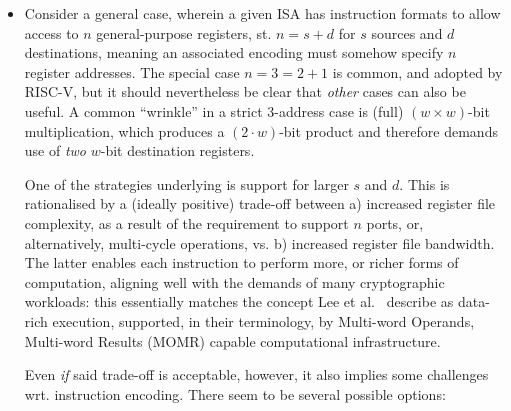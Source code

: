 \begin{itemize}
\item Consider a general case, wherein a given ISA has instruction formats
      to allow access to $n$ general-purpose registers, st. 
      $
      n = s + d
      $ 
      for $s$ sources and $d$ destinations, meaning an associated encoding 
      must somehow specify $n$ register addresses.  The special case
      $
      n = 3 = 2 + 1 
      $
      is common, and adopted by RISC-V, but it should nevertheless be clear
      that {\em other} cases can also be useful.  A common ``wrinkle'' in a 
      strict $3$-address case is (full) $( w \times w )$-bit multiplication, 
      which produces a $(2 \cdot w )$-bit product and therefore demands use 
      of {\em two} $w$-bit destination registers.
   
      One of the strategies underlying \XCID is support for larger $s$ and
      $d$.  This is rationalised by a (ideally positive) trade-off between
      a) increased register file complexity, as a result of the requirement
         to support $n$ ports, or, alternatively, multi-cycle operations,
         vs.
      b) increased register file bandwidth.
      The latter enables each instruction to perform more, or richer forms 
      of computation, aligning well with the demands of many cryptographic 
      workloads: this essentially matches the concept
      Lee et al.~\cite{SCARV:LeeYanShi:04}
      describe as data-rich execution, supported, in their terminology, by 
      Multi-word Operands, Multi-word Results (MOMR)
      capable computational infrastructure.

      Even {\em if} said trade-off is acceptable, however, it also implies 
      some challenges wrt. instruction encoding.  There seem to be several 
      possible options:


\end{itemize}
